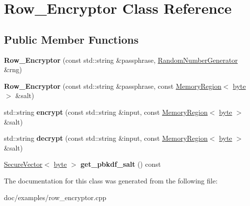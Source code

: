 \hypertarget{classRow__Encryptor}{\section{Row\-\_\-\-Encryptor Class Reference}
\label{classRow__Encryptor}
}
\subsection*{Public Member Functions}
\begin{DoxyCompactItemize}
\item 
\hypertarget{classRow__Encryptor_a35c2977fc9519eeebc3bfc4be8f94fd3}{{\bfseries Row\-\_\-\-Encryptor} (const std\-::string \&passphrase, \hyperlink{classBotan_1_1RandomNumberGenerator}{Random\-Number\-Generator} \&rng)}\label{classRow__Encryptor_a35c2977fc9519eeebc3bfc4be8f94fd3}

\item 
\hypertarget{classRow__Encryptor_ae47ee5c5496fa14fbb5f2f4b8ea813bd}{{\bfseries Row\-\_\-\-Encryptor} (const std\-::string \&passphrase, const \hyperlink{classBotan_1_1MemoryRegion}{Memory\-Region}$<$ \hyperlink{namespaceBotan_a7d793989d801281df48c6b19616b8b84}{byte} $>$ \&salt)}\label{classRow__Encryptor_ae47ee5c5496fa14fbb5f2f4b8ea813bd}

\item 
\hypertarget{classRow__Encryptor_aae28109282ee495b6b558b004a00b8f8}{std\-::string {\bfseries encrypt} (const std\-::string \&input, const \hyperlink{classBotan_1_1MemoryRegion}{Memory\-Region}$<$ \hyperlink{namespaceBotan_a7d793989d801281df48c6b19616b8b84}{byte} $>$ \&salt)}\label{classRow__Encryptor_aae28109282ee495b6b558b004a00b8f8}

\item 
\hypertarget{classRow__Encryptor_a7a6e7006261f729fb48527e73fb03a59}{std\-::string {\bfseries decrypt} (const std\-::string \&input, const \hyperlink{classBotan_1_1MemoryRegion}{Memory\-Region}$<$ \hyperlink{namespaceBotan_a7d793989d801281df48c6b19616b8b84}{byte} $>$ \&salt)}\label{classRow__Encryptor_a7a6e7006261f729fb48527e73fb03a59}

\item 
\hypertarget{classRow__Encryptor_a9b569dee0b7454c4b73a693c065ffe2f}{\hyperlink{classBotan_1_1SecureVector}{Secure\-Vector}$<$ \hyperlink{namespaceBotan_a7d793989d801281df48c6b19616b8b84}{byte} $>$ {\bfseries get\-\_\-pbkdf\-\_\-salt} () const }\label{classRow__Encryptor_a9b569dee0b7454c4b73a693c065ffe2f}

\end{DoxyCompactItemize}


The documentation for this class was generated from the following file\-:\begin{DoxyCompactItemize}
\item 
doc/examples/row\-\_\-encryptor.\-cpp\end{DoxyCompactItemize}
